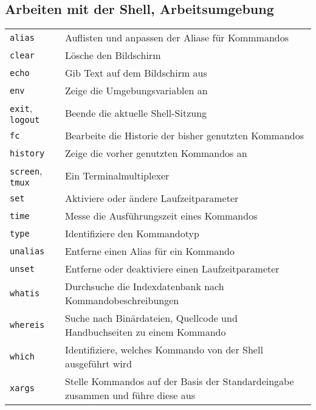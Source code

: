 \documentclass[10pt,a4paper]{article}
\begin{document}
\begin{multicols}{2}
\section{Arbeiten mit der Shell, Arbeitsumgebung}
\begin{tabular}{ p{2.5cm} p{8.5cm} }
  \hline
  \texttt{alias} & Auflisten und anpassen der Aliase für Kommmandos \\
  \rowcolor{Gray}
  \texttt{clear} & Lösche den Bildschirm \\
  \texttt{echo} & Gib Text auf dem Bildschirm aus \\
  \rowcolor{Gray}
  \texttt{env} & Zeige die Umgebungsvariablen an \\
  \texttt{exit}, \texttt{logout} & Beende die aktuelle Shell-Sitzung \\
  \rowcolor{Gray}
  \texttt{fc} & Bearbeite die Historie der bisher genutzten Kommandos\\
  \texttt{history} & Zeige die vorher genutzten Kommandos an \\
  \rowcolor{Gray}
  \texttt{screen}, \texttt{tmux} & Ein Terminalmultiplexer \\
  \texttt{set} & Aktiviere oder ändere Laufzeitparameter \\
  \rowcolor{Gray}
  \texttt{time} & Messe die Ausführungszeit eines Kommandos \\
  \texttt{type} & Identifiziere den Kommandotyp \\
  \rowcolor{Gray}
  \texttt{unalias} & Entferne einen Alias für ein Kommando \\
  \texttt{unset} & Entferne oder deaktiviere einen Laufzeitparameter \\
  \rowcolor{Gray}
  \texttt{whatis} & Durchsuche die Indexdatenbank nach Kommando\-beschreibungen \\
  \texttt{whereis} & Suche nach Binärdateien, Quellcode und Handbuchseiten zu einem Kommando \\
  \rowcolor{Gray}
  \texttt{which} & Identifiziere, welches Kommando von der Shell ausgeführt wird\\
  \texttt{xargs} & Stelle Kommandos auf der Basis der Standardeingabe zusammen und führe diese aus \\
  \hline
\end{tabular}



\end{multicols}
\end{document}

